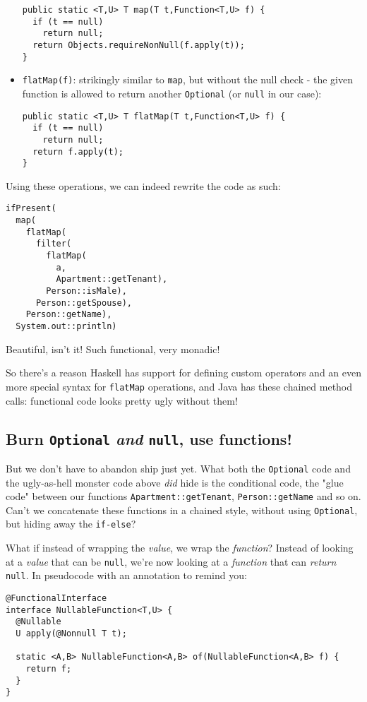 \documentclass[11pt]{article}
\begin{document}
\begin{itemize}
\begin{verbatim}
public static <T,U> T map(T t,Function<T,U> f) {
  if (t == null)
    return null;
  return Objects.requireNonNull(f.apply(t));
}
\end{verbatim}
\item \texttt{flatMap(f)}: strikingly similar to \texttt{map}, but without the null check - the given function is allowed to return another \texttt{Optional} (or \texttt{null} in our case):
\begin{verbatim}
public static <T,U> T flatMap(T t,Function<T,U> f) {
  if (t == null)
    return null;
  return f.apply(t);
}
\end{verbatim}
\end{itemize}

Using these operations, we can indeed rewrite the code as such:

\begin{verbatim}
ifPresent(
  map(
    flatMap(
      filter(
        flatMap(
          a,
          Apartment::getTenant),
        Person::isMale),
      Person::getSpouse),
    Person::getName),
  System.out::println)
\end{verbatim}

Beautiful, isn't it! Such functional, very monadic!

So there's a reason Haskell has support for defining custom operators and an even more special syntax for \texttt{flatMap} operations, and Java has these chained method calls: functional code looks pretty ugly without them!
\subsection*{Burn \texttt{Optional} \emph{and} \texttt{null}, use functions!}
\label{sec:orgheadline5}
But we don't have to abandon ship just yet. What both the \texttt{Optional} code and the ugly-as-hell monster code above \emph{did} hide is the conditional code, the "glue code" between our functions \texttt{Apartment::getTenant}, \texttt{Person::getName} and so on. Can't we concatenate these functions in a chained style, without using \texttt{Optional}, but hiding away the \texttt{if-else}?

What if instead of wrapping the \emph{value}, we wrap the \emph{function}? Instead of looking at a \emph{value} that can be \texttt{null}, we're now looking at a \emph{function} that can \emph{return} \texttt{null}. In pseudocode with an annotation to remind you:

\begin{verbatim}
@FunctionalInterface
interface NullableFunction<T,U> {
  @Nullable
  U apply(@Nonnull T t);

  static <A,B> NullableFunction<A,B> of(NullableFunction<A,B> f) {
    return f;
  }
}
\end{verbatim}
\end{document}
